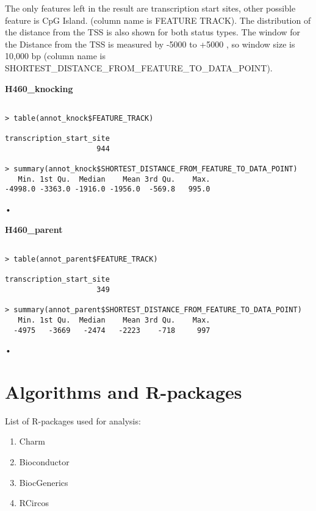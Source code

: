 \documentclass[11pt]{article}
\begin{document}
The only features left in the result are transcription start sites, other possible feature is CpG Island. (column name  is  FEATURE TRACK). The distribution of the distance from the TSS is also shown for both status types. The window for the Distance from the TSS is measured by  -5000 to +5000 , so window size is 10,000 bp (column name is SHORTEST\_DISTANCE\_FROM\_FEATURE\_TO\_DATA\_POINT).


{\bf H460\_knocking}

\begin{verbatim}

> table(annot_knock$FEATURE_TRACK)

transcription_start_site 
                     944 

> summary(annot_knock$SHORTEST_DISTANCE_FROM_FEATURE_TO_DATA_POINT)
   Min. 1st Qu.  Median    Mean 3rd Qu.    Max. 
-4998.0 -3363.0 -1916.0 -1956.0  -569.8   995.0 

\end{verbatim}•


{\bf H460\_parent}

\begin{verbatim}

> table(annot_parent$FEATURE_TRACK)

transcription_start_site 
                     349 

> summary(annot_parent$SHORTEST_DISTANCE_FROM_FEATURE_TO_DATA_POINT)
   Min. 1st Qu.  Median    Mean 3rd Qu.    Max. 
  -4975   -3669   -2474   -2223    -718     997 

\end{verbatim}•



\section*{Algorithms and R-packages}

List of R-packages used for analysis:
\begin{enumerate}

\item Charm

\item Bioconductor

\item BiocGenerics

\item RCircos

\end{enumerate}
\end{document}
